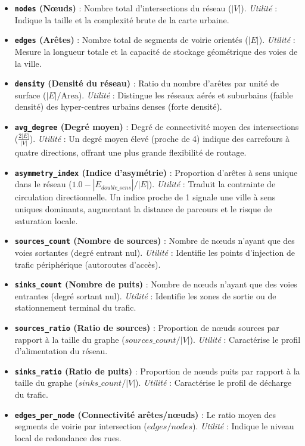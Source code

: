 \documentclass[10pt, a4paper]{article}
\providecommand{\tightlist}{}
\begin{document}
\begin{itemize}
\tightlist
\item
  \textbf{\texttt{nodes} (Nœuds)} : Nombre total d'intersections du
  réseau (\(|V|\)). \emph{Utilité} : Indique la taille et la complexité
  brute de la carte urbaine.
\item
  \textbf{\texttt{edges} (Arêtes)} : Nombre total de segments de voirie
  orientés (\(|E|\)). \emph{Utilité} : Mesure la longueur totale et la
  capacité de stockage géométrique des voies de la ville.
\item
  \textbf{\texttt{density} (Densité du réseau)} : Ratio du nombre
  d'arêtes par unité de surface (\(|E|/\text{Area}\)). \emph{Utilité} :
  Distingue les réseaux aérés et suburbains (faible densité) des
  hyper-centres urbains denses (forte densité).
\item
  \textbf{\texttt{avg\_degree} (Degré moyen)} : Degré de connectivité
  moyen des intersections (\(\frac{2|E|}{|V|}\)). \emph{Utilité} : Un
  degré moyen élevé (proche de 4) indique des carrefours à quatre
  directions, offrant une plus grande flexibilité de routage.
\item
  \textbf{\texttt{asymmetry\_index} (Indice d'asymétrie)} : Proportion
  d'arêtes à sens unique dans le réseau
  (\(1.0 - |E_{double\_sens}|/|E|\)). \emph{Utilité} : Traduit la
  contrainte de circulation directionnelle. Un indice proche de 1
  signale une ville à sens uniques dominants, augmentant la distance de
  parcours et le risque de saturation locale.
\item
  \textbf{\texttt{sources\_count} (Nombre de sources)} : Nombre de nœuds
  n'ayant que des voies sortantes (degré entrant nul). \emph{Utilité} :
  Identifie les points d'injection de trafic périphérique (autoroutes
  d'accès).
\item
  \textbf{\texttt{sinks\_count} (Nombre de puits)} : Nombre de nœuds
  n'ayant que des voies entrantes (degré sortant nul). \emph{Utilité} :
  Identifie les zones de sortie ou de stationnement terminal du trafic.
\item
  \textbf{\texttt{sources\_ratio} (Ratio de sources)} : Proportion de
  nœuds sources par rapport à la taille du graphe
  (\(sources\_count/|V|\)). \emph{Utilité} : Caractérise le profil
  d'alimentation du réseau.
\item
  \textbf{\texttt{sinks\_ratio} (Ratio de puits)} : Proportion de nœuds
  puits par rapport à la taille du graphe (\(sinks\_count/|V|\)).
  \emph{Utilité} : Caractérise le profil de décharge du trafic.
\item
  \textbf{\texttt{edges\_per\_node} (Connectivité arêtes/nœuds)} : Le
  ratio moyen des segments de voirie par intersection
  (\(edges / nodes\)). \emph{Utilité} : Indique le niveau local de
  redondance des rues.
\end{itemize}
\end{document}
